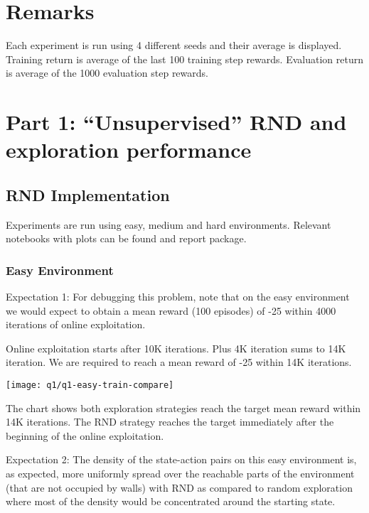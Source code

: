 \documentclass[11pt]{article}
\begin{document}
    \section*{Remarks}

    Each experiment is run using 4 different seeds and their average is displayed.
    Training return is average of the last 100 training step rewards.
    Evaluation return is average of the 1000 evaluation step rewards.

    \section*{Part 1: “Unsupervised” RND and exploration performance}

    \subsection*{RND Implementation}

    Experiments are run using easy, medium and hard environments.
    Relevant notebooks with plots can be found and report package.

    \subsubsection*{Easy Environment}

    Expectation 1: For debugging this problem, note that on the easy environment we would expect to obtain a mean reward (100 episodes) of -25 within 4000 iterations of online exploitation.

    Online exploitation starts after 10K iterations.
    Plus 4K iteration sums to 14K iteration.
    We are required to reach a mean reward of -25 within 14K iterations.

    \hspace*{-0.6in}
    \texttt{[image: q1/q1-easy-train-compare]}

    The chart shows both exploration strategies reach the target mean reward within 14K iterations.
    The RND strategy reaches the target immediately after the beginning of the online exploitation.

    Expectation 2: The density of the state-action pairs on this easy environment is, as expected, more uniformly spread over the reachable parts of the environment (that are not occupied by walls) with RND as compared to random exploration where most of the density would be concentrated around the starting state.
\end{document}
